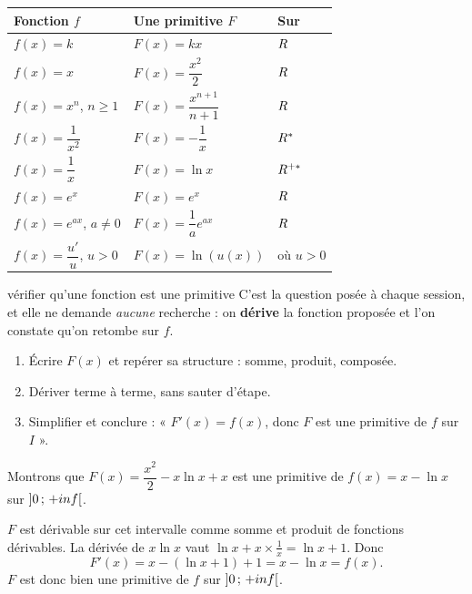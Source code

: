 \begin{propriete}
\begin{center}
\renewcommand{\arraystretch}{1.55}
\begin{tabular}{|L{3.6cm}|L{4.2cm}|L{3.4cm}|}
\hline
\textbf{Fonction $f$} & \textbf{Une primitive $F$} & \textbf{Sur} \\
\hline
$f(x) = k$ & $F(x) = kx$ & $R$ \\
$f(x) = x$ & $F(x) = \dfrac{x^{2}}{2}$ & $R$ \\
$f(x) = x^{n}$, $n \geq 1$ & $F(x) = \dfrac{x^{n+1}}{n+1}$ & $R$ \\
$f(x) = \dfrac{1}{x^{2}}$ & $F(x) = -\dfrac1x$ & $R^{*}$ \\
$f(x) = \dfrac1x$ & $F(x) = \ln x$ & $R^{+*}$ \\
$f(x) = e^{x}$ & $F(x) = e^{x}$ & $R$ \\
$f(x) = e^{ax}$, $a \neq 0$ & $F(x) = \dfrac{1}{a}e^{ax}$ & $R$ \\
$f(x) = \dfrac{u'}{u}$, $u>0$ & $F(x) = \ln\left(u(x)\right)$ & où $u>0$ \\
\hline
\end{tabular}
\end{center}
\end{propriete}

\begin{methode}{vérifier qu'une fonction est une primitive}
C'est la question posée à chaque session, et elle ne demande \emph{aucune}
recherche : on \textbf{dérive} la fonction proposée et l'on constate qu'on
retombe sur $f$.
\begin{enumerate}[label=\textbf{\arabic*.}, leftmargin=*, itemsep=0.15em]
  \item Écrire $F(x)$ et repérer sa structure : somme, produit, composée.
  \item Dériver terme à terme, sans sauter d'étape.
  \item Simplifier et conclure : « $F'(x) = f(x)$, donc $F$ est une
        primitive de $f$ sur $I$ ».
\end{enumerate}
\end{methode}

\begin{exemple}
Montrons que $F(x) = \dfrac{x^{2}}{2}-x\ln x+x$ est une primitive de
$f(x) = x-\ln x$ sur $\left]0\,;\,+inf\right[$.

$F$ est dérivable sur cet intervalle comme somme et produit de fonctions
dérivables. La dérivée de $x\ln x$ vaut $\ln x+x\times\frac1x = \ln x+1$.
Donc
\[
  F'(x) = x-\left(\ln x+1\right)+1 = x-\ln x = f(x).
\]
$F$ est donc bien une primitive de $f$ sur $\left]0\,;\,+inf\right[$.
\end{exemple}

